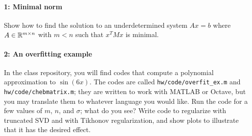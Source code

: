 \documentclass[12pt, leqno]{article} %
\begin{document}

\paragraph*{1: Minimal norm}
Show how to find the solution to an underdetermined system
$Ax = b$ where $A \in \mathbb{R}^{m \times n}$ with $m < n$ such
that $x^T M x$ is minimal.

\paragraph*{2: An overfitting example}
In the class repository, you will find codes that compute
a polynomial approximation to $\sin(6x)$.  The codes are called
{\tt hw/code/overfit\_ex.m} and {\tt hw/code/chebmatrix.m};
they are written to work with MATLAB or Octave, but you may
translate them to whatever language you would like.  Run the code
for a few values of $m$, $n$, and $\sigma$; what do you see?
Write code to regularize with truncated SVD and with Tikhonov
regularization, and show plots to illustrate that it has the
desired effect.
\end{document}

